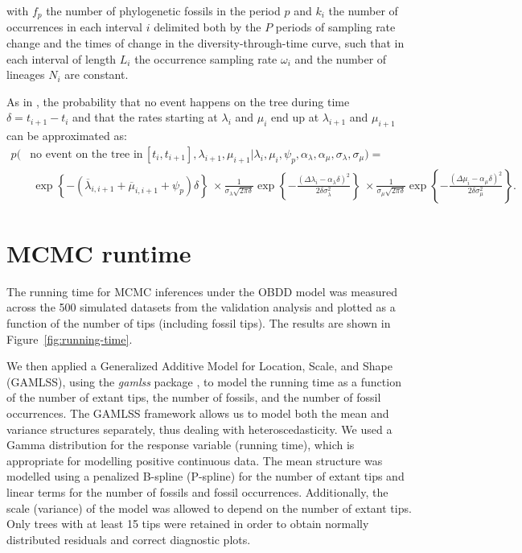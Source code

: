 \documentclass[oupdraft]{sysbio}
\def \bar{\overline}
\begin{document}
\begin{appendices}
with $f_p$ the number of phylogenetic fossils in the period $p$ and $k_i$ the number of occurrences in each interval $i$ delimited both by the $P$ periods of sampling rate change and the times of change in the diversity-through-time curve, such that in each interval of length $L_i$ the occurrence sampling rate $\omega_i$ and the number of lineages $N_i$ are constant.

As in \citet{quintero_rise_2025}, the probability that no event happens on the tree during time $\delta = t_{i+1} - t_i$ and that the rates starting at $\lambda_i$ and $\mu_i$ end up at $\lambda_{i+1}$ and $\mu_{i+1}$ can be approximated as:
\begin{align*}
  p(& \text{no event on the tree in}\,[t_i, t_{i+1}], \lambda_{i+1}, \mu_{i+1} | \lambda_i, \mu_i, \psi_p, \alpha_{\lambda}, \alpha_{\mu}, \sigma_{\lambda}, \sigma_{\mu}) = \\
  & \: \exp \left\{- (\bar{\lambda}_{i,i+1} + \bar{\mu}_{i,i+1} + \psi_p) \delta \right\} \: \times
  \frac{1}{\sigma_{\lambda} \sqrt{2\pi \delta}} \exp \left\{ - \frac{(\Delta \lambda_i - \alpha_{\lambda} \delta)^2 }{ 2 \delta \sigma_{\lambda}^2} \right\} \: \times
  \frac{1}{\sigma_{\mu} \sqrt{2\pi \delta}} \exp \left\{ - \frac{(\Delta \mu_i - \alpha_{\mu}\delta)^2 }{ 2 \delta \sigma_{\mu}^2} \right\}.
\end{align*}

\section{MCMC runtime} \label{SM-runtime}

The running time for MCMC inferences under the OBDD model was measured across the 500 simulated datasets from the validation analysis and plotted as a function of the number of tips (including fossil tips). The results are shown in Figure~\ref{fig:running-time}.

We then applied a Generalized Additive Model for Location, Scale, and Shape (GAMLSS), using the \textit{gamlss} package \citep{rigby_generalized_2005, r_core_team_r_2018}, to model the running time as a function of the number of extant tips, the number of fossils, and the number of fossil occurrences. The GAMLSS framework allows us to model both the mean and variance structures separately, thus dealing with heteroscedasticity. We used a Gamma distribution for the response variable (running time), which is appropriate for modelling positive continuous data. The mean structure was modelled using a penalized B-spline (P-spline) for the number of extant tips and linear terms for the number of fossils and fossil occurrences. Additionally, the scale (variance) of the model was allowed to depend on the number of extant tips. Only trees with at least 15 tips were retained in order to obtain normally distributed residuals and correct diagnostic plots.


\end{appendices}
\end{document}
